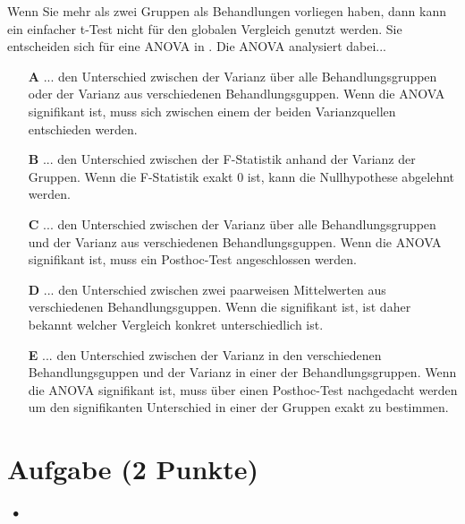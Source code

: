 \documentclass[a4paper, 9pt]{scrartcl}\usepackage[]{graphicx}\usepackage[]{xcolor}
\begin{document}
Wenn Sie mehr als zwei Gruppen als Behandlungen vorliegen haben, dann kann ein einfacher t-Test nicht für den globalen Vergleich genutzt werden. Sie entscheiden sich für eine ANOVA in \Rlogo. Die ANOVA analysiert dabei...



\begin{enumerate}
\item [\textbf{A} \msquare] ... den Unterschied zwischen der Varianz über alle Behandlungsgruppen oder der Varianz aus verschiedenen Behandlungsguppen. Wenn die ANOVA signifikant ist, muss sich zwischen einem der beiden Varianzquellen entschieden werden.
\item [\textbf{B} \msquare] ... den Unterschied zwischen der F-Statistik anhand der Varianz der Gruppen. Wenn die F-Statistik exakt 0 ist, kann die Nullhypothese abgelehnt werden.
\item [\textbf{C} \msquare] ... den Unterschied zwischen der Varianz über alle Behandlungsgruppen und der Varianz aus verschiedenen Behandlungsguppen. Wenn die ANOVA signifikant ist, muss ein Posthoc-Test angeschlossen werden.
\item [\textbf{D} \msquare] ... den Unterschied zwischen zwei paarweisen Mittelwerten aus verschiedenen Behandlungsguppen. Wenn die signifikant ist, ist daher bekannt welcher Vergleich konkret unterschiedlich ist.
\item [\textbf{E} \msquare] ... den Unterschied zwischen der Varianz in den verschiedenen Behandlungsguppen und der Varianz in einer der Behandlungsgruppen. Wenn die ANOVA signifikant ist, muss über einen Posthoc-Test nachgedacht werden um den signifikanten Unterschied in einer der Gruppen exakt zu bestimmen.
\end{enumerate}

\section{Aufgabe \hfill (2 Punkte)}

\ifcollection
\begin{flushright}
\tiny\vspace{-2Ex}
\textbf{\examinhaltstart}
\exammodulestatversuch $\;\bullet$
\exammodulebiostat
\vspace{-1Ex}
\end{flushright}
\fi
\end{document}
